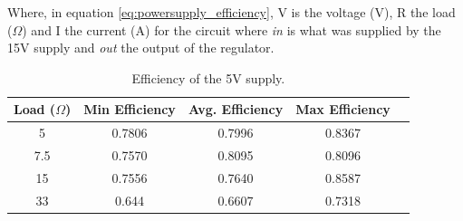 Where, in equation \ref{eq:powersupply_efficiency}, V is the voltage (V), R the load ($\Omega$) and I the current (A) for the circuit where \textit{in} is what was supplied by the 15V supply and \textit{out} the output of the regulator.


\begin{table}[H]
\centering
\begin{tabular}{|c|c|c|c|c|}
\hline
Load ($\Omega$) & Min Efficiency & Avg. Efficiency & Max Efficiency \\ \hline
5 & 0.7806 & 0.7996 & 0.8367 \\ \hline
7.5 & 0.7570 & 0.8095 & 0.8096 \\ \hline
15 & 0.7556 & 0.7640 & 0.8587 \\ \hline
33 & 0.644 & 0.6607 & 0.7318 \\ \hline
\end{tabular}
\caption{Efficiency of the 5V supply.}
\label{tab:voltageefficiency}
\end{table}